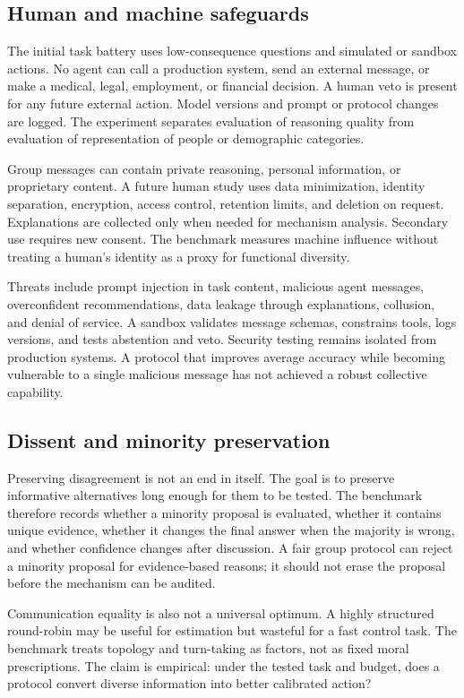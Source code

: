 \documentclass[conference]{IEEEtran}
\begin{document}
\subsection{Human and machine safeguards}

The initial task battery uses low-consequence questions and simulated or sandbox actions. No agent can call a production system, send an external message, or make a medical, legal, employment, or financial decision. A human veto is present for any future external action. Model versions and prompt or protocol changes are logged. The experiment separates evaluation of reasoning quality from evaluation of representation of people or demographic categories.

Group messages can contain private reasoning, personal information, or proprietary content. A future human study uses data minimization, identity separation, encryption, access control, retention limits, and deletion on request. Explanations are collected only when needed for mechanism analysis. Secondary use requires new consent. The benchmark measures machine influence without treating a human's identity as a proxy for functional diversity.

Threats include prompt injection in task content, malicious agent messages, overconfident recommendations, data leakage through explanations, collusion, and denial of service. A sandbox validates message schemas, constrains tools, logs versions, and tests abstention and veto. Security testing remains isolated from production systems. A protocol that improves average accuracy while becoming vulnerable to a single malicious message has not achieved a robust collective capability.

\subsection{Dissent and minority preservation}

Preserving disagreement is not an end in itself. The goal is to preserve informative alternatives long enough for them to be tested. The benchmark therefore records whether a minority proposal is evaluated, whether it contains unique evidence, whether it changes the final answer when the majority is wrong, and whether confidence changes after discussion. A fair group protocol can reject a minority proposal for evidence-based reasons; it should not erase the proposal before the mechanism can be audited.

Communication equality is also not a universal optimum. A highly structured round-robin may be useful for estimation but wasteful for a fast control task. The benchmark treats topology and turn-taking as factors, not as fixed moral prescriptions. The claim is empirical: under the tested task and budget, does a protocol convert diverse information into better calibrated action?
\end{document}
